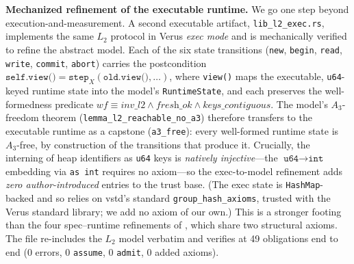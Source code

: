 \documentclass[journal,compsoc,10pt]{IEEEtran}
\theoremstyle{definition}
\theoremstyle{remark}
\begin{document}
\medskip
\noindent\textbf{Mechanized refinement of the executable runtime.}
We go one step beyond execution-and-measurement. A second executable
artifact, \texttt{lib\_l2\_exec.rs}, implements the same $L_2$ protocol in
Verus \emph{exec mode} and is mechanically verified to refine the abstract
model. Each of the six state transitions (\texttt{new}, \texttt{begin},
\texttt{read}, \texttt{write}, \texttt{commit}, \texttt{abort}) carries the
postcondition $\texttt{self.view()} = \texttt{step}_X(\texttt{old.view()},
\dots)$, where \texttt{view()} maps the executable, \texttt{u64}-keyed
runtime state into the model's \texttt{RuntimeState}, and each preserves the
well-formedness predicate $\textit{wf} \equiv \textit{inv\_l2} \wedge
\textit{fresh\_ok} \wedge \textit{keys\_contiguous}$. The model's
$A_3$-freedom theorem (\texttt{lemma\_l2\_reachable\_no\_a3}) therefore
transfers to the executable runtime as a capstone (\texttt{a3\_free}): every
well-formed runtime state is $A_3$-free, by construction of the transitions
that produce it. Crucially, the interning of heap identifiers as
\texttt{u64} keys is \emph{natively injective}---the $\texttt{u64} \to
\texttt{int}$ embedding via \texttt{as int} requires no axiom---so the
exec-to-model refinement adds \emph{zero author-introduced} entries to the
trust base. (The exec state is \texttt{HashMap}-backed and so relies on
vstd's standard \texttt{group\_hash\_axioms}, trusted with the Verus
standard library; we add no axiom of our own.) This is
a stronger footing than the four spec--runtime refinements of
, which share two structural axioms. The file
re-includes the $L_2$ model verbatim and verifies at 49 obligations end to
end (0 errors, 0 \texttt{assume}, 0 \texttt{admit}, 0 added axioms).
\end{document}
